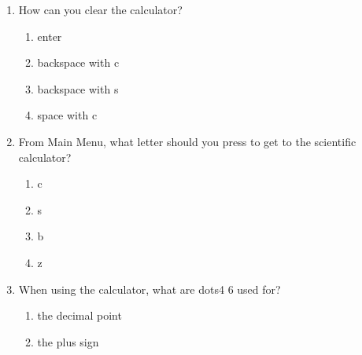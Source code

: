 \documentclass[10pt,letterpaper,twoside]{report}
\begin{document}
{{{{\begin{enumerate}
	      \begin{enumerate}
		      \item dots3 4 6
		            
		      \item dots4 6
		            
		      \item dots1 6
		            
		      \item dots3 6
		            
		            
	      \end{enumerate}
	\item How can you clear the calculator?
	      
	      \begin{enumerate}
		      \item enter
		            
		      \item backspace with c
		            
		      \item backspace with s
		            
		      \item space with c
		            
		            
	      \end{enumerate}
	\item From Main Menu, what letter should you press to get to the scientific calculator?
	      
	      \begin{enumerate}
		      \item c
		            
		      \item s
		            
		      \item b
		            
		      \item z
		            
		            
	      \end{enumerate}
	\item When using the calculator, what are dots4 6 used for?
	      
	      \begin{enumerate}
		      \item the decimal point
		            
		      \item the plus sign
		            

\end{enumerate}
\end{enumerate}}}}}
\end{document}
